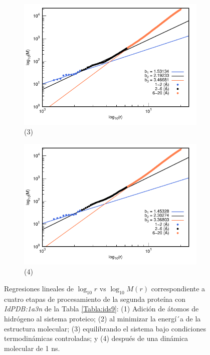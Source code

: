 \begin{figure}[H]
	\vspace{0cm} %
	
	\hspace{-0.3cm} 
	\begin{subfigure}{0.49\textwidth}
		\centering
		\includegraphics[width=\linewidth,page=1]{graphs/PDBs/1a3n/1a3nEq.pdf}
		\caption{(3)}
	\end{subfigure}
	\hspace{0.2cm}
	\begin{subfigure}{0.49\textwidth} %
		\centering
		\includegraphics[width=\linewidth,page=1]{graphs/PDBs/1a3n/1a3n1ns.pdf}
		\caption{(4)}
	\end{subfigure}
	\caption{Regresiones lineales de $\log_{10}r$ vs $\log_{10}M(r)$ correspondiente a cuatro etapas de procesamiento de la segunda prote\'{i}na con \textit{IdPDB:1a3n} de la Tabla \ref{Tabla:ids9}: (1) Adici\'{o}n de \'{a}tomos de hidr\'{o}geno al sistema proteico; (2) al minimizar la energ\'{i´}a de la estructura molecular; (3) equilibrando el sistema bajo condiciones termodin\'{a}micas controladas; y (4) despu\'{e}s de una din\'{a}mica molecular de 1 ns.}
	\label{fig:1a3n}
\end{figure}


